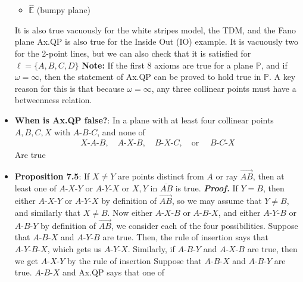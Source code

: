 \documentclass{report}
\begin{document}
\begin{itemize}
\begin{itemize}
                \item $\hat{\mathbb{E}}$ (bumpy plane)
            \end{itemize}
            It is also true vacuously for the white stripes model, the TDM, and the Fano plane
            \bigbreak \noindent 
            Ax.QP is also true for the Inside Out (IO) example. It is vacuously two for the 2-point lines, but we can also check that it is satisfied for $\ell = \{A,B,C,D\} $
            \bigbreak \noindent 
            \textbf{Note:} If the first 8 axioms are true for a plane $\mathbb{P}$, and if $\omega = \infty$, then the statement of Ax.QP can be proved to hold true in $\mathbb{P}$. A key reason for this is that because $\omega = \infty$, any three collinear points must have a betweenness relation.
        \item \textbf{When is Ax.QP false?}: In a plane with at least four collinear points $A,B,C,X$ with $ A\text{-}B\text{-}C$, and none of 
            \bigbreak \noindent 
            \begin{align*}
                    X\text{-}A\text{-}B, \quad A\text{-}X\text{-}B, \quad B\text{-}X\text{-}C, \quad \text{or } \quad B\text{-}C\text{-}X
            \end{align*}
            Are true
        \item \textbf{Proposition 7.5}: If $X \ne Y$ are points distinct from $A$ or ray $\overrightarrow{AB}$, then at least one of $ A\text{-}X\text{-}Y$ or $ A\text{-}Y\text{-}X$ or $X,Y$ in $ \overline{AB}$ is true.
            \bigbreak \noindent 
            \textbf{\textit{Proof.}} If $Y = B$, then either $ A\text{-}X\text{-}Y$ or $ A\text{-}Y\text{-}X$ by definition of $ \overrightarrow{AB}$, so we may assume that $Y \ne B$, and similarly that $X \ne B$.
            \bigbreak \noindent 
            Now either $ A\text{-}X\text{-}B$ or $ A\text{-}B\text{-}X$, and either $ A\text{-}Y\text{-}B$ or $ A\text{-}B\text{-}Y$ by definition of $ \overrightarrow{AB}$, we consider each of the four possibilities. 
            \bigbreak \noindent 
            Suppose that $ A\text{-}B\text{-}X$ and $ A\text{-}Y\text{-}B$ are true. Then, the rule of insertion says that $ A\text{-}Y\text{-}B\text{-}X$, which gets us $ A\text{-}Y\text{-}X$. Similarly, if $ A\text{-}B\text{-}Y$ and $ A\text{-}X\text{-}B$ are true, then we get $ A\text{-}X\text{-}Y$ by the rule of insertion
            \bigbreak \noindent 
            Suppose that $ A\text{-}B\text{-}X$ and $ A\text{-}B\text{-}Y$ are true. $ A\text{-}B\text{-}X $ and Ax.QP says that one of 
            \begin{align*}

\end{align*}
\end{itemize}
\end{document}
